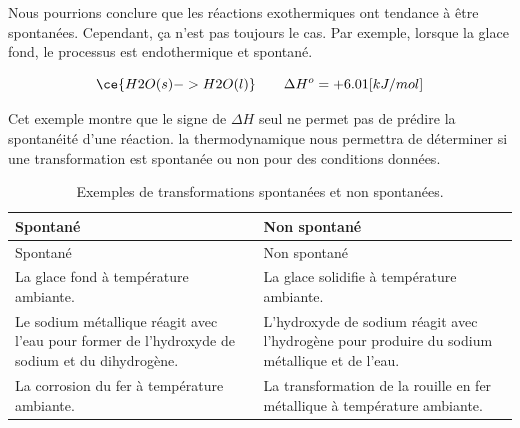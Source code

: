 \documentclass[
  11pt,
  french,
  a4paper,
  openany]{book}
\begin{document}
Nous pourrions conclure que les réactions exothermiques ont tendance à être spontanées. Cependant, ça n'est pas toujours le cas. Par exemple, lorsque la glace fond, le processus est endothermique et spontané.

\[
\ce{H2O(s) -> H2O(l)} \qquad \Delta H^{o} = +6.01 [kJ/mol]
\]

Cet exemple montre que le signe de \(\Delta H\) seul ne permet pas de prédire la spontanéité d'une réaction. la thermodynamique nous permettra de déterminer si une transformation est spontanée ou non pour des conditions données.

\clearpage

\begin{longtable}[]{@{}ll@{}}
\caption{\label{tab:spontane-non-spontane-exemples} Exemples de transformations spontanées et non spontanées.}\tabularnewline
\toprule
\begin{minipage}[b]{0.47\columnwidth}\raggedright
Spontané\strut
\end{minipage} & \begin{minipage}[b]{0.47\columnwidth}\raggedright
Non spontané\strut
\end{minipage}\tabularnewline
\midrule
\endfirsthead
\toprule
\begin{minipage}[b]{0.47\columnwidth}\raggedright
Spontané\strut
\end{minipage} & \begin{minipage}[b]{0.47\columnwidth}\raggedright
Non spontané\strut
\end{minipage}\tabularnewline
\midrule
\endhead
\begin{minipage}[t]{0.47\columnwidth}\raggedright
La glace fond à température ambiante.\strut
\end{minipage} & \begin{minipage}[t]{0.47\columnwidth}\raggedright
La glace solidifie à température ambiante.\strut
\end{minipage}\tabularnewline
\begin{minipage}[t]{0.47\columnwidth}\raggedright
Le sodium métallique réagit avec l'eau pour former de l'hydroxyde de sodium et du dihydrogène.\strut
\end{minipage} & \begin{minipage}[t]{0.47\columnwidth}\raggedright
L'hydroxyde de sodium réagit avec l'hydrogène pour produire du sodium métallique et de l'eau.\strut
\end{minipage}\tabularnewline
\begin{minipage}[t]{0.47\columnwidth}\raggedright
La corrosion du fer à température ambiante.\strut
\end{minipage} & \begin{minipage}[t]{0.47\columnwidth}\raggedright
La transformation de la rouille en fer métallique à température ambiante.\strut
\end{minipage}\tabularnewline
\bottomrule
\end{longtable}
\end{document}
